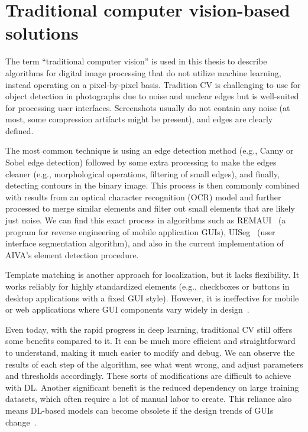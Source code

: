 \documentclass[
  digital,     %
  oneside,     %
  nosansbold,  %
  nocolorbold, %
  lof,         %
  lot,         %
]{fithesis4}
\begin{document}
\section{Traditional computer vision-based solutions}
\label{sec:traditionalCV}

The term \enquote{traditional computer vision} is used in this thesis to describe algorithms for digital image processing that do not utilize machine learning, instead operating on a pixel-by-pixel basis. Tradition CV is challenging to use for object detection in photographs due to noise and unclear edges but is well-suited for processing user interfaces. Screenshots usually do not contain any noise (at most, some compression artifacts might be present), and edges are clearly defined.

The most common technique is using an edge detection method (e.g., Canny or Sobel edge detection) followed by some extra processing to make the edges cleaner (e.g., morphological operations, filtering of small edges), and finally, detecting contours in the binary image. This process is then commonly combined with results from an optical character recognition (OCR) model and further processed to merge similar elements and filter out small elements that are likely just noise. We can find this exact process in algorithms such as REMAUI~\cite{remaui} (a program for reverse engineering of mobile application GUIs), UISeg~\cite{uiseg} (user interface segmentation algorithm), and also in the current implementation of AIVA's element detection procedure.

Template matching is another approach for localization, but it lacks flexibility. It works reliably for highly standardized elements (e.g., checkboxes or buttons in desktop applications with a fixed GUI style). However, it is ineffective for mobile or web applications where GUI components vary widely in design~\cite{ODforGUI_CV_DL_or_both}.

Even today, with the rapid progress in deep learning, traditional CV still offers some benefits compared to it. It can be much more efficient and straightforward to understand, making it much easier to modify and debug. We can observe the results of each step of the algorithm, see what went wrong, and adjust parameters and thresholds accordingly. These sorts of modifications are difficult to achieve with DL. Another significant benefit is the reduced dependency on large training datasets, which often require a lot of manual labor to create. This reliance also means DL-based models can become obsolete if the design trends of GUIs change~\cite{DLvsTCV}.
\end{document}
